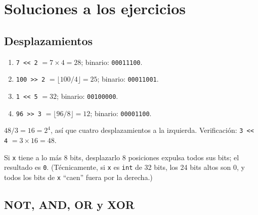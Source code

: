 \documentclass[12pt, oneside]{article}
\begin{document}
\section{Soluciones a los ejercicios}

\subsection{Desplazamientos}

\begin{notaprofesor}[Ejercicio 1]
\begin{enumerate}[label=\alph*)]
  \item \texttt{7 << 2} $= 7 \times 4 = 28$; binario: \texttt{00011100}.
  \item \texttt{100 >> 2} $= \lfloor 100/4 \rfloor = 25$; binario: \texttt{00011001}.
  \item \texttt{1 << 5} $= 32$; binario: \texttt{00100000}.
  \item \texttt{96 >> 3} $= \lfloor 96/8 \rfloor = 12$; binario: \texttt{00001100}.
\end{enumerate}
\end{notaprofesor}

\begin{notaprofesor}[Ejercicio 2]
  $48 / 3 = 16 = 2^4$, así que cuatro desplazamientos a la izquierda.
  Verificación: \texttt{3 << 4} $= 3 \times 16 = 48$. \checkmark
\end{notaprofesor}

\begin{notaprofesor}[Ejercicio 3]
  Si \texttt{x} tiene a lo más 8 bits, desplazarlo 8 posiciones expulsa
  todos sus bits; el resultado es \texttt{0}. (Técnicamente, si \texttt{x}
  es \texttt{int} de 32 bits, los 24 bits altos son 0, y todos los bits
  de \texttt{x} ``caen'' fuera por la derecha.)
\end{notaprofesor}

\subsection{NOT, AND, OR y XOR}
\end{document}
